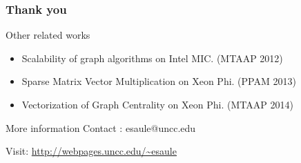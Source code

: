 \documentclass{beamer}
\begin{document}
\begin{frame}
  \frametitle{Thank you}

  \begin{block}{Other related works}
    \begin{itemize}
    \item Scalability of graph algorithms on Intel MIC. (MTAAP 2012)
    \item Sparse Matrix Vector Multiplication on Xeon Phi. (PPAM 2013)
    \item Vectorization of Graph Centrality on Xeon Phi. (MTAAP 2014)
    \end{itemize}
  \end{block}
  
  \begin{block}{More information}
    Contact : esaule@uncc.edu

    Visit: \url{http://webpages.uncc.edu/~esaule}
  \end{block}
\end{frame}



\end{document}

